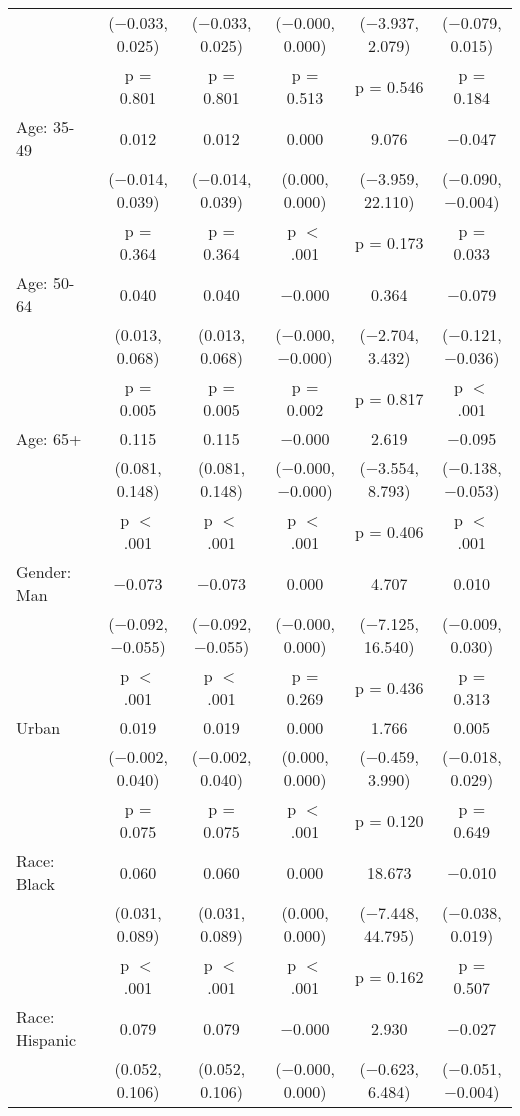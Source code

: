 \begin{tabular}{@{\extracolsep{5pt}}lccccc}
  & ($-$0.033, 0.025) & ($-$0.033, 0.025) & ($-$0.000, 0.000) & ($-$3.937, 2.079) & ($-$0.079, 0.015) \\ 
  & p = 0.801 & p = 0.801 & p = 0.513 & p = 0.546 & p = 0.184 \\ 
  Age: 35\mbox{-}49 & 0.012 & 0.012 & 0.000 & 9.076 & $-$0.047 \\ 
  & ($-$0.014, 0.039) & ($-$0.014, 0.039) & (0.000, 0.000) & ($-$3.959, 22.110) & ($-$0.090, $-$0.004) \\ 
  & p = 0.364 & p = 0.364 & p $<$ .001 & p = 0.173 & p = 0.033 \\ 
  Age: 50\mbox{-}64 & 0.040 & 0.040 & $-$0.000 & 0.364 & $-$0.079 \\ 
  & (0.013, 0.068) & (0.013, 0.068) & ($-$0.000, $-$0.000) & ($-$2.704, 3.432) & ($-$0.121, $-$0.036) \\ 
  & p = 0.005 & p = 0.005 & p = 0.002 & p = 0.817 & p $<$ .001 \\ 
  Age: 65+ & 0.115 & 0.115 & $-$0.000 & 2.619 & $-$0.095 \\ 
  & (0.081, 0.148) & (0.081, 0.148) & ($-$0.000, $-$0.000) & ($-$3.554, 8.793) & ($-$0.138, $-$0.053) \\ 
  & p $<$ .001 & p $<$ .001 & p $<$ .001 & p = 0.406 & p $<$ .001 \\ 
  Gender: Man & $-$0.073 & $-$0.073 & 0.000 & 4.707 & 0.010 \\ 
  & ($-$0.092, $-$0.055) & ($-$0.092, $-$0.055) & ($-$0.000, 0.000) & ($-$7.125, 16.540) & ($-$0.009, 0.030) \\ 
  & p $<$ .001 & p $<$ .001 & p = 0.269 & p = 0.436 & p = 0.313 \\ 
  Urban & 0.019 & 0.019 & 0.000 & 1.766 & 0.005 \\ 
  & ($-$0.002, 0.040) & ($-$0.002, 0.040) & (0.000, 0.000) & ($-$0.459, 3.990) & ($-$0.018, 0.029) \\ 
  & p = 0.075 & p = 0.075 & p $<$ .001 & p = 0.120 & p = 0.649 \\ 
  Race: Black & 0.060 & 0.060 & 0.000 & 18.673 & $-$0.010 \\ 
  & (0.031, 0.089) & (0.031, 0.089) & (0.000, 0.000) & ($-$7.448, 44.795) & ($-$0.038, 0.019) \\ 
  & p $<$ .001 & p $<$ .001 & p $<$ .001 & p = 0.162 & p = 0.507 \\ 
  Race: Hispanic & 0.079 & 0.079 & $-$0.000 & 2.930 & $-$0.027 \\ 
  & (0.052, 0.106) & (0.052, 0.106) & ($-$0.000, 0.000) & ($-$0.623, 6.484) & ($-$0.051, $-$0.004) \\ 

\end{tabular}
